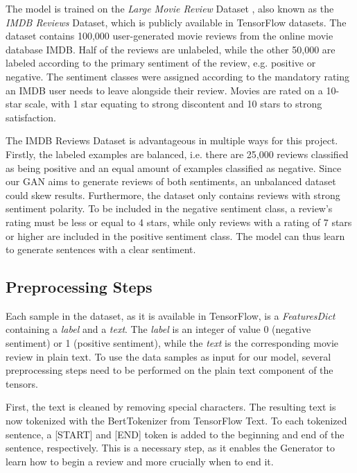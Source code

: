 \documentclass[../main]{subfiles}
\begin{document}
The model is trained on the \textit{Large Movie Review} Dataset \cite{maas-EtAl:2011:ACL-HLT2011}, also known as the \textit{IMDB Reviews} Dataset, which is publicly available in TensorFlow datasets. The dataset contains 100,000 user-generated movie reviews from the online movie database IMDB.  Half of the reviews are unlabeled, while the other 50,000 are labeled according to the primary sentiment of the review, e.g. positive or negative.  The sentiment classes were assigned according to the mandatory rating an IMDB user needs to leave alongside their review. Movies are rated on a 10-star scale, with 1 star equating to strong discontent and 10 stars to strong satisfaction.  

The IMDB Reviews Dataset is advantageous in multiple ways for this project. Firstly, the labeled examples are balanced, i.e. there are 25,000 reviews classified as being positive and an equal amount of examples classified as negative.  Since our GAN aims to generate reviews of both sentiments,  an unbalanced dataset could skew results.  Furthermore,  the dataset only contains reviews with strong sentiment polarity.  To be included in the negative sentiment class, a review's rating must be less or equal to 4 stars, while only reviews with a rating of 7 stars or higher are included in the positive sentiment class.  The model can thus learn to generate sentences with a clear sentiment.

\subsection{Preprocessing Steps}

Each sample in the dataset, as it is available in TensorFlow, is a \textit{FeaturesDict} containing a \textit{label} and a \textit{text}. The \textit{label} is an integer of value 0 (negative sentiment) or 1 (positive sentiment), while the \textit{text} is the corresponding movie review in plain text. To use the data samples as input for our model, several preprocessing steps need to be performed on the plain text component of the tensors. 

First,  the text is cleaned by removing special characters. The resulting text is now tokenized with the BertTokenizer from TensorFlow Text. To each tokenized sentence, a [START] and [END] token is added to the beginning and end of the sentence, respectively. This is a necessary step, as it enables the Generator to learn how to begin a review and more crucially when to end it. 
\end{document}
